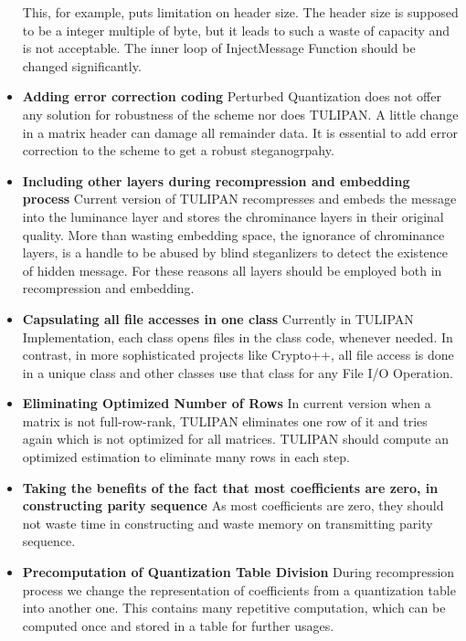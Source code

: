 \begin{itemize}
	    This, for example, puts limitation on header size. The header size is supposed to be a integer multiple of byte, but it leads to such a waste of capacity and is not acceptable. The inner loop of InjectMessage Function should be changed significantly.
	
	  \item {\bf Adding error correction coding} Perturbed Quantization does not offer any solution for robustness of the scheme nor does TULIPAN. A little change in a matrix header can damage all remainder data. It is essential to add error correction to the scheme to get a robust steganogrpahy.
	  \item {\bf Including other layers during recompression and embedding process} Current version of TULIPAN recompresses and embeds the message into the luminance layer and stores the chrominance layers in their original quality. More than wasting embedding space, the ignorance of chrominance layers, is a handle to be abused by blind steganlizers to detect the existence of hidden message. For these reasons all layers should be employed both in recompression and embedding.

           \item {\bf Capsulating all file accesses in one class}
	     Currently in TULIPAN Implementation, each class opens files in the class code, whenever needed. In contrast, in more sophisticated projects like Crypto++, all file access is done in a unique class and other classes use that class for any File I/O Operation.
	     \item{\bf Eliminating Optimized Number of Rows} In current version when a matrix is not full-row-rank, TULIPAN eliminates one row of it and tries again which is not optimized for all matrices. TULIPAN should compute an optimized estimation to eliminate many rows in each step.

	   \item {\bf Taking the benefits of the fact that most coefficients are zero, in constructing parity sequence} As most coefficients are zero, they should not waste time in constructing and waste memory on transmitting parity sequence.

	   \item {\bf Precomputation of Quantization Table Division} During recompression process we change the representation of coefficients from a quantization table into another one. This contains many repetitive computation, which can be computed once and stored in a table for further usages.


\end{itemize}
